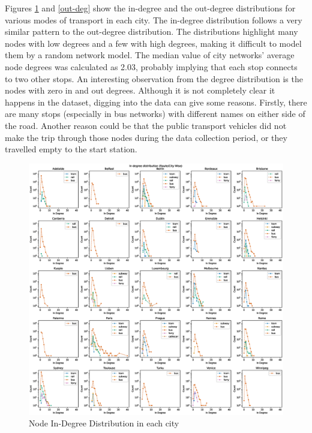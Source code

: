 \documentclass{article}
\theoremstyle{plain}
\theoremstyle{definition}
\theoremstyle{remark}
\begin{document}
Figures \ref{in-deg} and \ref{out-deg} show the in-degree and the out-degree distributions for various modes of transport in each city. The in-degree distribution follows a very similar pattern to the out-degree distribution. The distributions highlight many nodes with low degrees and a few with high degrees, making it difficult to model them by a random network model. The median value of city networks' average node degrees was calculated as 2.03, probably implying that each stop connects to two other stops. An interesting observation from the degree distribution is the nodes with zero in and out degrees. Although it is not completely clear it happens in the dataset, digging into the data can give some reasons. Firstly, there are many stops (especially in bus networks) with different names on either side of the road. Another reason could be that the public transport vehicles did not make the trip through those nodes during the data collection period, or they travelled empty to the start station.

\begin{figure}[ht]
\vskip -0.1in
\begin{center}
\centerline{\includegraphics[width=\columnwidth]{images/in_deg_distribution.eps}}
\caption{Node In-Degree Distribution in each city}
\label{in-deg}
\end{center}
\vskip -0.3in
\end{figure}
\end{document}
